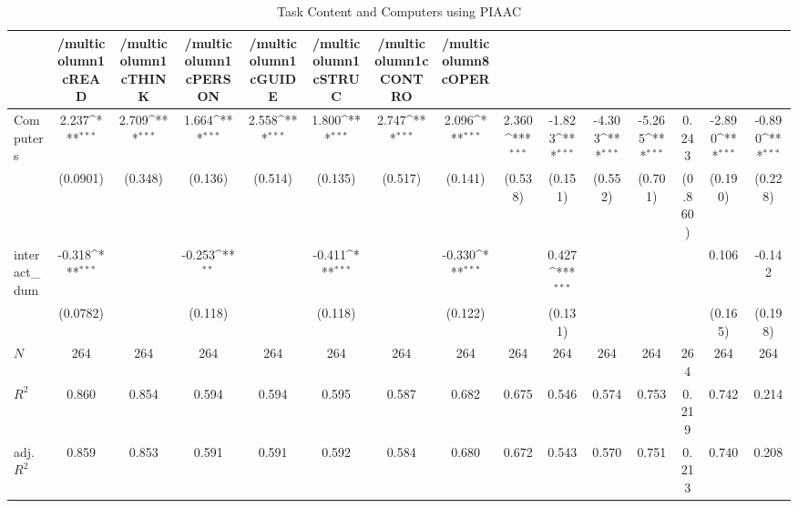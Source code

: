 \begin{table}[htbp]\centering
\def\sym#1{\ifmmode^{#1}\else\(^{#1}\)\fi}
\caption{Task Content and Computers using PIAAC}
\begin{tabular}{l*{14}{c}}
\hline\hline
            &/multicolumn{1}{c}{READ}&/multicolumn{1}{c}{THINK}&/multicolumn{1}{c}{PERSON}&/multicolumn{1}{c}{GUIDE}&/multicolumn{1}{c}{STRUC}&/multicolumn{1}{c}{CONTRO}&/multicolumn{8}{c}{OPER}                                                                                                                                                       \\
\hline
Computers   &       2.237\sym{***}&       2.709\sym{***}&       1.664\sym{***}&       2.558\sym{***}&       1.800\sym{***}&       2.747\sym{***}&       2.096\sym{***}&       2.360\sym{***}&      -1.823\sym{***}&      -4.303\sym{***}&      -5.265\sym{***}&       0.243         &      -2.890\sym{***}&      -0.890\sym{***}\\
            &    (0.0901)         &     (0.348)         &     (0.136)         &     (0.514)         &     (0.135)         &     (0.517)         &     (0.141)         &     (0.538)         &     (0.151)         &     (0.552)         &     (0.701)         &     (0.860)         &     (0.190)         &     (0.228)         \\
[1em]
interact\_dum&      -0.318\sym{***}&                     &      -0.253\sym{**} &                     &      -0.411\sym{***}&                     &      -0.330\sym{***}&                     &       0.427\sym{***}&                     &                     &                     &       0.106         &      -0.142         \\
            &    (0.0782)         &                     &     (0.118)         &                     &     (0.118)         &                     &     (0.122)         &                     &     (0.131)         &                     &                     &                     &     (0.165)         &     (0.198)         \\
\hline
\(N\)       &         264         &         264         &         264         &         264         &         264         &         264         &         264         &         264         &         264         &         264         &         264         &         264         &         264         &         264         \\
\(R^{2}\)   &       0.860         &       0.854         &       0.594         &       0.594         &       0.595         &       0.587         &       0.682         &       0.675         &       0.546         &       0.574         &       0.753         &       0.219         &       0.742         &       0.214         \\
adj. \(R^{2}\)&       0.859         &       0.853         &       0.591         &       0.591         &       0.592         &       0.584         &       0.680         &       0.672         &       0.543         &       0.570         &       0.751         &       0.213         &       0.740         &       0.208         \\
\hline\hline
\end{tabular}
\end{table}
